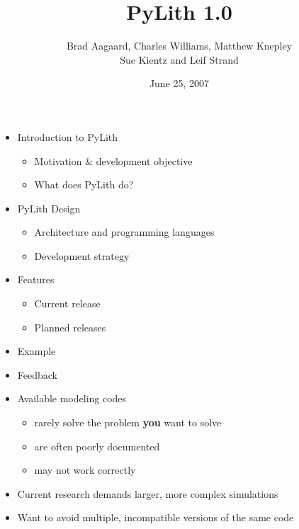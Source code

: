 \documentclass[pdftex,cig,slideColor]{pp4slides}
\title{PyLith 1.0}
\subtitle{}
\author{Brad Aagaard, Charles Williams, Matthew Knepley\\[10pt]
  Sue Kientz and Leif Strand}
\date{June 25, 2007}
\begin{document}
\maketitle
\vfill

  \summary{}  

  \begin{itemize}
  \item Introduction to PyLith
    \begin{itemize}
    \item Motivation \& development objective
    \item What does PyLith do?
    \end{itemize}
  \item PyLith Design
    \begin{itemize}
    \item Architecture and programming languages
    \item Development strategy
    \end{itemize}
  \item Features
    \begin{itemize}
    \item Current release
    \item Planned releases
    \end{itemize}
  \item Example
  \item Feedback
  \end{itemize}


  \summary{}
  
  \begin{itemize}
  \item Available modeling codes
    \begin{itemize}
    \item rarely solve the problem {\bf you} want to solve
    \item are often poorly documented
    \item may not work correctly
    \end{itemize}
  \item Current research demands larger, more complex simulations
  \item Want to avoid multiple, incompatible versions of the same code
  \end{itemize}
\end{document}
